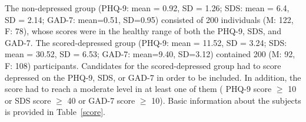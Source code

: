 \documentclass[10pt,twocolumn,letterpaper]{article}
\begin{document}
The non-depressed group (PHQ-9: mean = 0.92, SD = 1.26; SDS: mean = 6.4, SD = 2.14; GAD-7: mean=0.51, SD=0.95) consisted of 200 individuals
(M: 122, F: 78), whose scores were in the healthy range of both the PHQ-9, SDS, and GAD-7.
The scored-depressed group (PHQ-9: mean = 11.52, SD = 3.24; SDS: mean = 30.52, SD = 6.53; GAD-7: mean=9.40, SD=3.12) contained 200 (M: 92, F: 108) participants.
Candidates for the scored-depressed group had to score depressed on the PHQ-9, SDS, or GAD-7 in order to be included.
In addition, the score had to reach a moderate level in at least one of them ( PHQ-9 score $\geq$ 10 or SDS score $\geq$ 40 or GAD-7 score $\geq$ 10).
Basic information about the subjects is provided in Table~\ref{score}.

\begin{table}[]
\caption{Basic information of the scored-depressed and non-depressed groups.}
\label{score}
\end{table}



{\small


}
\end{document}
